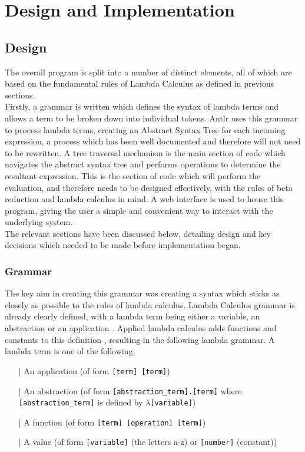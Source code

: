 \documentclass[a4paper,12pt]{report}
\begin{document}
\chapter{Design and Implementation}
\section{Design}

The overall program is split into a number of distinct elements, all of which are based on the fundamental rules of Lambda Calculus as defined in previous sections.\\

Firstly, a grammar is written which defines the syntax of lambda terms and allows a term to be broken down into individual tokens. Antlr uses this grammar to process lambda terms, creating an Abstract Syntax Tree for each incoming expression\cite{Parr2012}, a process which has been well documented and therefore will not need to be rewritten. A tree traversal mechanism is the main section of code which navigates the abstract syntax tree and performs operations to determine the resultant expression. This is the section of code which will perform the evaluation, and therefore needs to be designed effectively, with the rules of beta reduction and lambda calculus in mind. A web interface is used to house this program, giving the user a simple and convenient way to interact with the underlying system.\\

The relevant sections have been discussed below, detailing design and key decisions which needed to be made before implementation began. %

\subsection{Grammar}

The key aim in creating this grammar was creating a syntax which sticks as closely as possible to the rules of lambda calculus. Lambda Calculus grammar is already clearly defined, with a lambda term being either a variable, an abstraction or an application \cite{Hankin2004}. Applied lambda calculus adds functions and constants to this definition \cite{Slonneger1995}, resulting in the following lambda grammar. A lambda term is one of the following:

\begin{itemize}
\item[|] An application (of form \texttt{[term] [term]})
\item[|] An abstraction (of form \texttt{[abstraction_term].[term]} where \texttt{[abstraction_term]} is defined by \texttt{$\lambda$[variable]})
\item[|] A function (of form \texttt{[term] [operation] [term]})
\item[|] A value (of form \texttt{[variable]} (the letters a-z) or \texttt{[number]} (constant))
\end{itemize}
\end{document}
